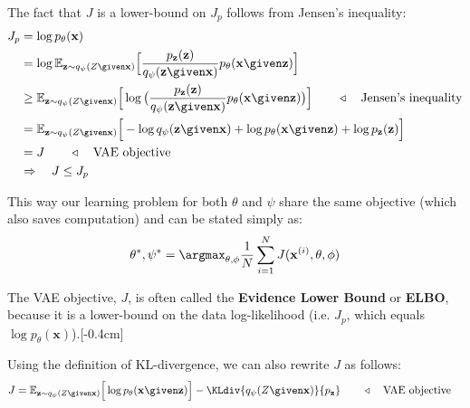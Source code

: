 The fact that $J$ is a lower-bound on $J_p$ follows from Jensen's inequality:
\begin{align}
    J_p &= \log p_{\theta}(\mathbf{x})\\
    &= \log \mathbb{E}_{\mathbf{z}\sim q_{\psi}(Z \given \mathbf{x})}\Big[\frac{p_{\mathbf{z}}(\mathbf{z})}{q_{\psi}(\mathbf{z} \given \mathbf{x})} p_{\theta}(\mathbf{x} \given \mathbf{z})\Big]\\
    &\geq \mathbb{E}_{\mathbf{z}\sim q_{\psi}(Z \given \mathbf{x})}\Big[\log \big(\frac{p_{\mathbf{z}}(\mathbf{z})}{q_{\psi}(\mathbf{z} \given \mathbf{x})} p_{\theta}(\mathbf{x} \given \mathbf{z})\big)\Big] \quad\quad \triangleleft \quad\text{Jensen's inequality}\label{eqn:generative_modeling_meets_representation_learning:lowerbound}\\
    &= \mathbb{E}_{\mathbf{z}\sim q_{\psi}(Z \given \mathbf{x})}\Big[-\log q_{\psi}(\mathbf{z} \given \mathbf{x}) + \log p_{\theta}(\mathbf{x} \given \mathbf{z}) + \log p_{\mathbf{z}}(\mathbf{z}) \Big]\\
    &= J \quad\quad\triangleleft\quad\text{VAE objective}\\
    &\Rightarrow \quad J \leq J_p
\end{align}%

This way our learning problem for both $\theta$ and $\psi$ share the same objective (which also saves computation) and can be stated simply as:
\begin{align}
    \theta^*, \psi^* = \argmax_{\theta, \phi} \frac{1}{N}\sum_{i=1}^N J(\mathbf{x}^{(i)}, \theta, \phi)
\end{align}

The VAE objective, $J$, is often called the \textbf{Evidence Lower Bound} or \textbf{ELBO}, because it is a lower-bound on the data log-likelihood (i.e. $J_p$, which equals $\log p_{\theta}(\mathbf{x})$).[-0.4cm]

Using the definition of KL-divergence, we can also rewrite $J$ as follows:
\begin{align}
    J &= \mathbb{E}_{\mathbf{z}\sim q_{\psi}(Z \given \mathbf{x})}\Big[\log p_{\theta}(\mathbf{x} \given \mathbf{z}) \Big] - \KLdiv{q_{\psi}(Z \given \mathbf{x})}{p_{\mathbf{z}}} \quad\quad\triangleleft\quad\text{VAE objective}\label{eqn:generative_modeling_meets_representation_learning:vae_objective_form2}
\end{align}

